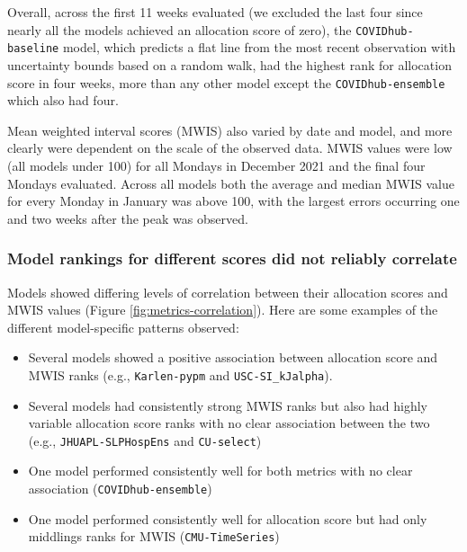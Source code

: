 \documentclass{article}\usepackage[]{graphicx}\usepackage[]{xcolor}
\makeatletter
\newenvironment{kframe}{%
 \def\at@end@of@kframe{}%
 \ifinner\ifhmode%
  \def\at@end@of@kframe{\end{minipage}}%
  \begin{minipage}{\columnwidth}%
 \fi\fi%
 \def\FrameCommand##1{\hskip\@totalleftmargin \hskip-\fboxsep
 \colorbox{shadecolor}{##1}\hskip-\fboxsep
     \hskip-\linewidth \hskip-\@totalleftmargin \hskip\columnwidth}%
 \MakeFramed {\advance\hsize-\width
   \@totalleftmargin\z@ \linewidth\hsize
   \@setminipage}}%
 {\par\unskip\endMakeFramed%
 \at@end@of@kframe}
\newenvironment{knitrout}{}{} %
\makeatother
\begin{document}
Overall, across the first 11 weeks evaluated (we excluded the last four since nearly all the models achieved an allocation score of zero), the \texttt{COVIDhub-baseline} model, which predicts a flat line from the most recent observation with uncertainty bounds based on a random walk, had the highest rank for allocation score in four weeks, more than any other model except the \texttt{COVIDhub-ensemble} which also had four.




Mean weighted interval scores (MWIS) also varied by date and model, and more clearly were dependent on the scale of the observed data.
MWIS values were low (all models under 100) for all Mondays in December 2021 and the final four Mondays evaluated.
Across all models both the average and median MWIS value for every Monday in January was above 100, with the largest errors occurring one and two weeks after the peak was observed.



\subsubsection{Model rankings for different scores did not reliably correlate}

\begin{knitrout}
\color{fgcolor}\begin{kframe}


{\ttfamily\noindent\bfseries{}}

{\ttfamily\noindent\bfseries{}}\end{kframe}
\end{knitrout}

Models showed differing levels of correlation between their allocation scores and MWIS values (Figure \ref{fig:metrics-correlation}).
Here are some examples of the different model-specific patterns observed:
\begin{itemize}
\item Several models showed a positive association between allocation score and MWIS ranks (e.g., \texttt{Karlen-pypm} and \texttt{USC-SI\_kJalpha}).
\item Several models had consistently strong MWIS ranks but also had highly variable allocation score ranks with no clear association between the two (e.g., \texttt{JHUAPL-SLPHospEns} and \texttt{CU-select})
\item One model performed consistently well for both metrics with no clear association (\texttt{COVIDhub-ensemble})
\item One model performed consistently well for allocation score but had only middlings ranks for MWIS (\texttt{CMU-TimeSeries})
\end{itemize}
\end{document}
